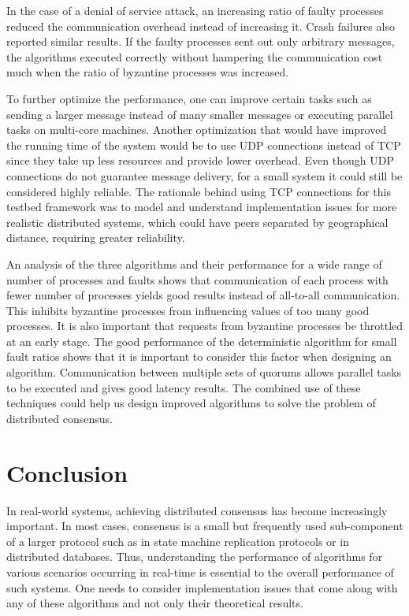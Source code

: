 In the case of a denial of service attack, an increasing ratio of faulty processes reduced the communication overhead instead of increasing it. Crash failures also reported similar results. If the faulty processes sent out only arbitrary messages, the algorithms executed correctly without hampering the communication cost much when the ratio of byzantine processes was increased.

To further optimize the performance, one can improve certain tasks such as sending a larger message instead of many smaller messages or executing parallel tasks on multi-core machines. Another optimization that would have improved the running time of the system would be to use UDP connections instead of TCP since they take up less resources and provide lower overhead. Even though UDP connections do not guarantee message delivery, for a small system it could still be considered highly reliable. The rationale behind using TCP connections for this testbed framework was to model and understand implementation issues for more realistic distributed systems, which could have peers separated by geographical distance, requiring greater reliability. 

An analysis of the three algorithms and their performance for a wide range of number of processes and faults shows that communication of each process with fewer number of processes yields good results instead of all-to-all communication. This inhibits byzantine processes from influencing values of too many good processes. It is also important that requests from byzantine processes be throttled at an early stage. The good performance of the deterministic algorithm for small fault ratios shows that it is important to consider this factor when designing an algorithm.  Communication between multiple sets of quorums allows parallel tasks to be executed and gives good latency results. The combined use of these techniques could help us design improved algorithms to solve the problem of distributed consensus. 



\section{Conclusion}
\label{sec:conc}
In real-world systems, achieving distributed consensus has become increasingly important. In most cases, consensus is a small but frequently used sub-component of a larger protocol such as in state machine replication protocols or in distributed databases. Thus, understanding the performance of algorithms for various scenarios occurring in real-time is essential to the overall performance of such systems. One needs to consider implementation issues that come along with any of these algorithms and not only their theoretical results. 

